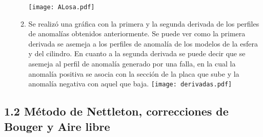 \documentclass{article}
\begin{document}
\begin{enumerate}
\begin{enumerate}
	\texttt{[image: ALosa.pdf]}
	\item Se realiz\'o una gr\'afica con la primera y la segunda derivada de los perfiles de anomal\'ias obtenidos anteriormente. Se puede ver como la primera derivada se asemeja a los perfiles de anomal\'ia de los modelos de la esfera y del cilindro. En cuanto a la segunda derivada se puede decir que se asemeja al perfil de anomal\'ia generado por una falla, en la cual la anomal\'ia positiva se asocia con la secci\'on de la placa que sube y la anomal\'ia negativa con aquel que baja. 
	\texttt{[image: derivadas.pdf]}
	\end{enumerate}
\end{enumerate}%

\subsection*{1.2 M\'etodo de Nettleton, correcciones de Bouger y Aire libre}
\end{document}
